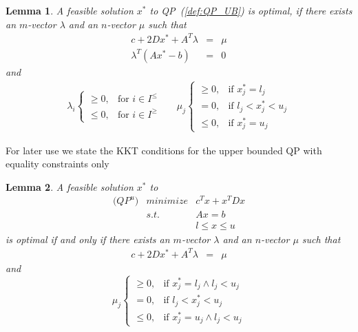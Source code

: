 \documentclass[a4paper]{article}
\newtheorem{lemma}{Lemma}
\begin{document}
\begin{lemma}
A feasible solution $x^{*}$ to QP~(\ref{def:QP_UB}) is optimal, if there exists an $m$-vector $\lambda$ and an $n$-vector $\mu$ such that 
\begin{eqnarray}
c + 2Dx^{*} +A^{T}\lambda
&=&
\mu  \\
\lambda^{T}\left(Ax^{*}-b\right)
&=&
0
\end{eqnarray}
and
\begin{eqnarray}
\label{def:mu_opt_cond}
\lambda_{i} \left\{
\begin{array}{ll}
\geq 0, & \text{for $i \in I^{\leq}$} \\
\leq 0, & \text{for $i \in I^{\geq}$}
\end{array}
\right.
&&
\mu_{j} \left\{
\begin{array}{ll}
\geq 0, & \text{if $x_{j}^{*}=l_{j}$} \\
= 0,    & \text{if $l_{j} < x_{j}^{*} < u_{j}$} \\
\leq 0, & \text{if $x_{j}^{*}=u_{j}$}
\end{array}
\right.
\end{eqnarray}
\end{lemma}
For later use we state the KKT conditions for the upper bounded QP with equality constraints only
\begin{lemma}
\label{lem:KKT_QP_UB_eq}
A feasible solution $x^{*}$ to
\begin{eqnarray}
  \mbox{($QP^{u}$)} &minimize& c^{T}x +x^{T}Dx
\nonumber      \\
\label{eq:QP_UB_eq_feas_cons}
    & s.t. & Ax = b  \\
\label{eq:QP_UB_eq_var_feas_cons}
    & & l \leq x \leq u  
\end{eqnarray}
is optimal if and only if there exists an $m$-vector $\lambda$ and an $n$-vector
$\mu$ such that
\begin{eqnarray}
c + 2Dx^{*} +A^{T}\lambda
&=&
\mu  
\end{eqnarray}
and
\begin{equation}
\label{eq:KKT_QP_UB_eq_mu_cond}
\mu_{j} \left\{
\begin{array}{ll}
\geq 0, & \text{if $x_{j}^{*}=l_{j} \wedge l_{j}<u_{j}$} \\
= 0,    & \text{if $l_{j} < x_{j}^{*} < u_{j}$} \\
\leq 0, & \text{if $x_{j}^{*}=u_{j} \wedge l_{j}<u_{j}$}
\end{array}
\right.
\end{equation} 
\end{lemma}
\end{document}
